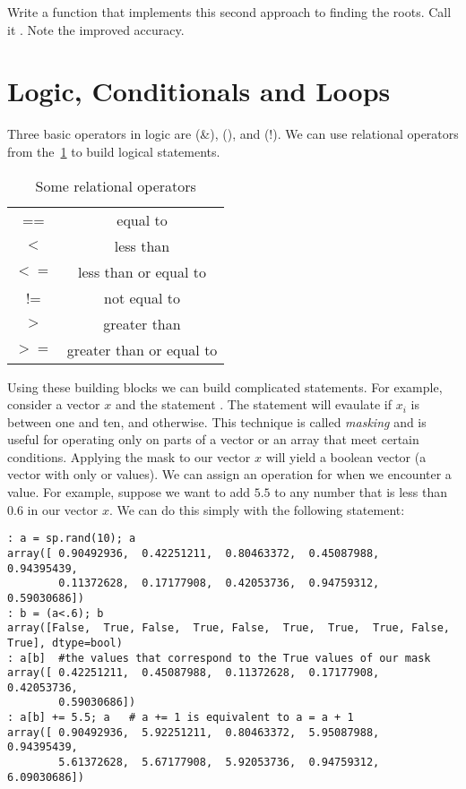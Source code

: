 \begin{problem}
Write a function that implements this second approach to finding the roots. Call it .  Note the improved accuracy.
\end{problem}

\section*{Logic, Conditionals and Loops}
Three basic operators in logic are  (\&),  (\textbar), and  (!). We can use relational operators from the~\ref{tbl:relops} to build logical statements.

\begin{table}[h!]
\begin{center}
\begin{tabular}{|c|c|}
	\hline
	== & equal to\\
	$<$ & less than\\
	$<=$ & less than or equal to\\
	!= & not equal to\\
	$>$ & greater than\\
	$>=$ & greater than or equal to\\
	\hline
\end{tabular}
\caption{Some relational operators}
\label{tbl:relops}
\end{center}
\end{table}

Using these building blocks we can build complicated statements. For example, consider a vector $x$ and the statement .  The statement will evaulate  if $x_i$ is between one and ten, and  otherwise.  This technique is called \emph{masking} and is useful for operating only on parts of a vector or an array that meet certain conditions.  Applying the mask to our vector $x$ will yield a boolean vector (a vector with only  or  values).  We can assign an operation for when we encounter a  value.  For example, suppose we want to add $5.5$ to any number that is less than $0.6$ in our vector $x$.  We can do this simply with the following statement:
\begin{lstlisting}[style=python]
: a = sp.rand(10); a
array([ 0.90492936,  0.42251211,  0.80463372,  0.45087988,  0.94395439,
        0.11372628,  0.17177908,  0.42053736,  0.94759312,  0.59030686])
: b = (a<.6); b
array([False,  True, False,  True, False,  True,  True,  True, False,  True], dtype=bool)
: a[b]  #the values that correspond to the True values of our mask
array([ 0.42251211,  0.45087988,  0.11372628,  0.17177908,  0.42053736,
        0.59030686])
: a[b] += 5.5; a   # a += 1 is equivalent to a = a + 1
array([ 0.90492936,  5.92251211,  0.80463372,  5.95087988,  0.94395439,
        5.61372628,  5.67177908,  5.92053736,  0.94759312,  6.09030686])
\end{lstlisting}

